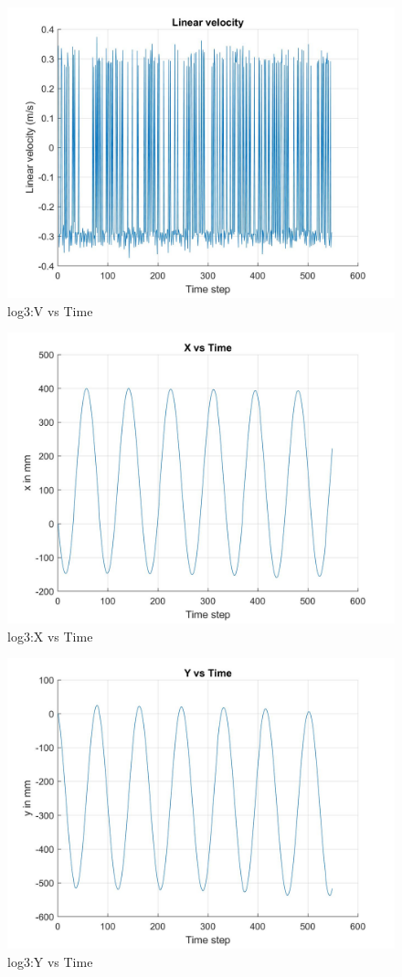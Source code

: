 \documentclass[paper=a4, fontsize=11pt]{scrartcl} %
\numberwithin{equation}{section} %
\numberwithin{figure}{section} %
\numberwithin{table}{section} %
\begin{document}
\begin{appendix}
\begin{figure}[H]
	\centering
	\includegraphics[width = 0.6\linewidth]{./figures/log3/vVsTime.jpg}
	\caption{log3:V vs Time}
\end{figure}

\begin{figure}[H]
	\centering
	\includegraphics[width = 0.6\linewidth]{./figures/log3/xVsTime.jpg}
	\caption{log3:X vs Time}
\end{figure}

\begin{figure}[H]
	\centering
	\includegraphics[width = 0.6\linewidth]{./figures/log3/yVsTime.jpg}
	\caption{log3:Y vs Time}
\end{figure}


\end{appendix}
\end{document}
